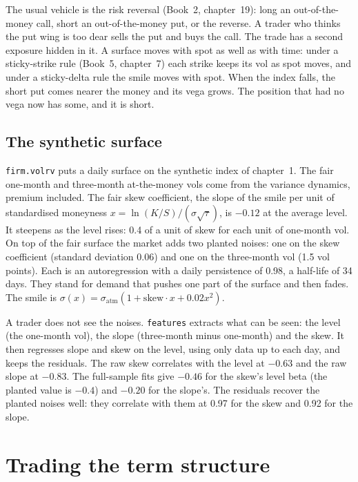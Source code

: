 The usual vehicle is the risk reversal (Book~2, chapter~19): long an out-of-the-money call, short an out-of-the-money put, or the reverse. A trader
who thinks the put wing is too dear sells the put and buys the call. The trade has a second exposure hidden in it. A surface moves with spot as well as
with time: under a sticky-strike rule (Book~5, chapter~7) each strike keeps its vol as spot moves, and under a sticky-delta rule the smile moves with
spot. When the index falls, the short put comes nearer the money and its vega grows. The position that had no vega now has some, and it is short.

\subsection*{The synthetic surface}

\texttt{firm.volrv} puts a daily surface on the synthetic index of chapter~1. The fair one-month and three-month at-the-money vols come from the
variance dynamics, premium included. The fair skew coefficient, the slope of the smile per unit of standardised moneyness $x = \ln(K/S)/(\sigma\sqrt\tau)$,
is $-0.12$ at the average level. It steepens as the level rises: 0.4 of a unit of skew for each unit of one-month vol. On top of the fair surface the
market adds two planted noises: one on the skew coefficient (standard deviation 0.06) and one on the three-month vol (1.5 vol points). Each is an
autoregression with a daily persistence of 0.98, a half-life of 34 days. They stand for demand that pushes one part of the surface and then fades. The
smile is $\sigma(x) = \sigma_{\mathrm{atm}}(1 + \text{skew}\cdot x + 0.02x^2)$.

A trader does not see the noises. \texttt{features} extracts what can be seen: the level (the one-month vol), the slope (three-month minus one-month) and
the skew. It then regresses slope and skew on the level, using only data up to each day, and keeps the residuals. The raw skew correlates with the
level at $-0.63$ and the raw slope at $-0.83$. The full-sample fits give $-0.46$ for the skew's level beta (the planted value is $-0.4$) and $-0.20$ for
the slope's. The residuals recover the planted noises well: they correlate with them at 0.97 for the skew and 0.92 for the slope.

\section{Trading the term structure}

